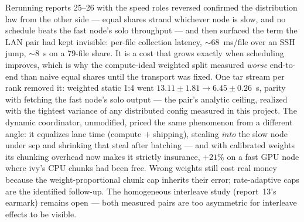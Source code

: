 \documentclass[
	english,
	letterpaper, oneside
]{article}
\begin{document}
Rerunning reports 25--26 with the speed roles reversed confirmed the
distribution law from the other side --- equal shares strand whichever
node is slow, and no schedule beats the fast node's solo throughput ---
and then surfaced the term the LAN pair had kept invisible: per-file
collection latency, $\sim$68~ms/file over an SSH jump, $\sim$8~s on a
79-file share. It is a cost that grows exactly when scheduling improves,
which is why the compute-ideal weighted split measured \emph{worse}
end-to-end than naive equal shares until the transport was fixed. One
tar stream per rank removed it: weighted static 1:4 went
$13.11\pm1.81 \to 6.45\pm0.26$~s, parity with fetching the fast node's
solo output --- the pair's analytic ceiling, realized with the tightest
variance of any distributed config measured in this project. The dynamic
coordinator, unmodified, priced the same phenomenon from a different
angle: it equalizes lane time (compute $+$ shipping), stealing
\emph{into} the slow node under scp and shrinking that steal after
batching --- and with calibrated weights its chunking overhead now makes
it strictly insurance, $+21\%$ on a fast GPU node where ivy's CPU chunks
had been free. Wrong weights still cost real money because the
weight-proportional chunk cap inherits their error; rate-adaptive caps
are the identified follow-up. The homogeneous interleave study
(report~13's earmark) remains open --- both measured pairs are too
asymmetric for interleave effects to be visible.
\end{document}
